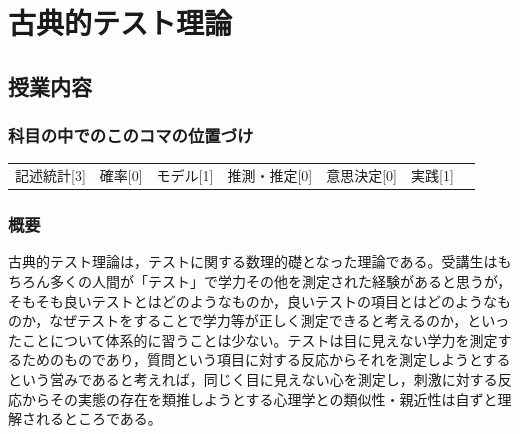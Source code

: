 \section{古典的テスト理論}
\label{D1_lesson06}

\subsection{授業内容}
\subsubsection{科目の中でのこのコマの位置づけ}
\begin{tabular}[t]{ccccccc}
    記述統計[3] & 確率[0] & モデル[1] & 推測・推定[0] & 意思決定[0] & 実践[1]
\end{tabular}
\subsubsection{概要}
古典的テスト理論は，テストに関する数理的礎となった理論である。受講生はもちろん多くの人間が「テスト」で学力その他を測定された経験があると思うが，そもそも良いテストとはどのようなものか，良いテストの項目とはどのようなものか，なぜテストをすることで学力等が正しく測定できると考えるのか，といったことについて体系的に習うことは少ない。テストは目に見えない学力を測定するためのものであり，質問という項目に対する反応からそれを測定しようとするという営みであると考えれば，同じく目に見えない心を測定し，刺激に対する反応からその実態の存在を類推しようとする心理学との類似性・親近性は自ずと理解されるところである。
